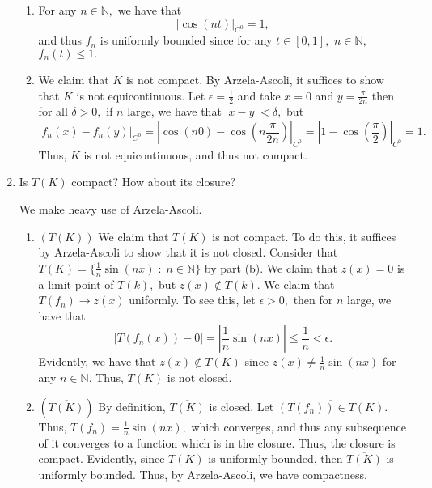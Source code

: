 \documentclass[11pt]{article}
\newcommand{\bbN}{\mathbb{N}}
\begin{document}
\begin{enumerate}
\begin{solution}
\begin{enumerate}
            
            \item For any $n \in \bbN,$ we have that 
            \[|\cos(nt)|_{C^0} =1,\] and thus $f_n$ is uniformly bounded since for any $t \in [0,1],$ $n \in \bbN,$ $f_n(t)\leq 1.$
            \item We claim that $K$ is not compact. By Arzela-Ascoli, it suffices to show that $K$ is not equicontinuous. Let $\epsilon = \frac{1}{2}$ and take $x = 0$ and $y = \frac{\pi}{2 n}$ then for all $\delta>0,$ if $n$ large, we have that $|x-y|< \delta,$ but 
            \[|f_n(x) - f_n(y)|_{C^0} = |\cos(n0) - \cos(n\frac{\pi}{2n})|_{C^0} = |1 - \cos(\frac{\pi}{2})|_{C^0} = 1.\] Thus, $K$ is not equicontinuous, and thus not compact.
        \end{enumerate}
    \end{solution}
    \item 
    \begin{problem}
        Is $T(K)$ compact? How about its closure?
    \end{problem}
    \begin{solution}
    We make heavy use of Arzela-Ascoli.
        \begin{enumerate}
            \item $(T(K))$ We claim that $T(K)$ is not compact. To do this, it suffices by Arzela-Ascoli to show that it is not closed. Consider that $T(K) = \{\frac{1}{n}\sin(nx)\; :\; n \in \bbN\}$ by part (b). We claim that $z(x) = 0$ is a limit point of $T(k),$ but $z(x)\notin T(k).$ We claim that 
            $T(f_n)\to z(x)$ uniformly. To see this, let $\epsilon>0,$ then for $n$ large, we have that 
            \[\left|T(f_n(x)) - 0\right| = \left|\frac{1}{n}\sin(nx)\right|\leq \frac{1}{n}< \epsilon.\] Evidently, we have that $z(x)\notin T(K)$ since $z(x)\neq \frac{1}{n}\sin(nx)$ for any $n\in \bbN.$ Thus, $T(K)$ is not closed.
            \item $(\overline{T(K)})$ By definition, $\overline{T(K)}$ is closed. Let $\overline{(T(f_n))\in T(K)}.$ Thus, $T(f_n)= \frac{1}{n}\sin(nx),$ which converges, and thus any subsequence of it converges to a function which is in the closure. Thus, the closure is compact. Evidently, since $T(K)$ is uniformly bounded, then $\overline{T(K)}$ is uniformly bounded. Thus, by Arzela-Ascoli, we have compactness.
        \end{enumerate}
    \end{solution}
\end{enumerate}
\newpage
\end{document}
